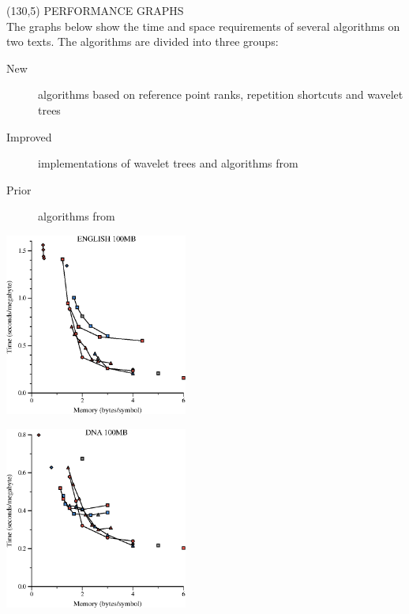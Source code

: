  \begin{textblock}{60}(130,5)
  {\sffamily\normalsize{\color{sciorange}
      PERFORMANCE GRAPHS}}\vspace{1mm}\\
  \footnotesize 
  The graphs below show the time and space requirements of several
  algorithms on two texts.  The algorithms are divided
  into three groups:
  \begin{description}
  \item[\color{new}New] algorithms based on reference point ranks, repetition
    shortcuts and wavelet trees
  \item[\color{improved}Improved] implementations of wavelet trees and
    algorithms from~\cite{ll2005}
  \item[\color{prior}Prior] algorithms from~\cite{s2001,ll2005}
  \end{description}
  \vspace{2mm}

  \includegraphics[width=60mm]{eng100Mb-new}
  \vspace{2mm}

  \includegraphics[width=60mm]{dna100Mb-new}
\end{textblock}
